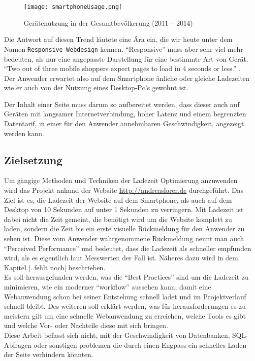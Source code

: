 	\begin{figure}[htbp]
		\begin{center}
			\texttt{[image: smartphoneUsage.png]}
		\end{center}
		\caption{Gerätenutzung in der Gesamtbevölkerung (2011 – 2014)\autocite{tns14}}
		\label{fig:geraetenutzung}
	\end{figure}

	Die Antwort auf diesen Trend läutete eine Ära ein, die wir heute unter dem Namen \texttt{Responsive Webdesign} kennen. "`Responsive"' muss aber sehr viel mehr bedeuten, als nur eine angepasste Darstellung für eine bestimmte Art von Gerät. "`Two out of three mobile shoppers expect pages to load in 4 seconds or less."' \autocite{radware13}. Der Anwender erwartet also auf dem Smartphone änliche oder gleiche Ladezeiten wie er auch von der Nutzung eines Desktop-Pc's gewohnt ist.

	Der Inhalt einer Seite muss darum so aufbereitet werden, dass dieser auch auf Geräten mit langsamer Internetverbindung, hoher Latenz und einem begrenzten Datentarif, in einer für den Anwender annehmbaren Geschwindigkeit, angezeigt werden kann.\\



\subsection{Zielsetzung} %
\label{sub:zielsetzung}
	Um gängige Methoden und Techniken der Ladezeit Optimierung anzuwenden wird das Projekt anhand der Website \url{http://andreaslorer.de} durchgeführt. Das Ziel ist es, die Ladezeit der Website auf dem Smartphone, als auch auf dem Desktop von 10 Sekunden auf unter 1 Sekunden zu verringern. Mit Ladezeit ist dabei nicht die Zeit gemeint, die benötigt wird um die Website komplett zu laden, sondern die Zeit bis ein erste visuelle Rückmeldung für den Anwender zu sehen ist. Diese vom Anwender wahrgenommene Rückmeldung nennt man auch "`Perceived Performance"' und bedeutet, dass die Ladezeit als schneller empfunden wird, als es eigentlich laut Messwerten der Fall ist. Näheres dazu wird in dem Kapitel \ref{..fehlt noch} beschrieben.\\
	Es soll herausgefunden werden, was die "`Best Practices"' sind um die Ladezeit zu minimieren, wie ein moderner "`workflow"' aussehen kann, damit eine Webanwendung schon bei seiner Entstehung schnell ladet und im Projektverlauf schnell bleibt. Des weiteren soll erklärt werden, was für herausforderungen es zu meistern gilt um eine schnelle Webanwendung zu erreichen, welche Tools es gibt und welche Vor- oder Nachteile diese mit sich bringen.\\
	Diese Arbeit befasst sich nicht, mit der Geschwindigkeit von Datenbanken, SQL-Abfragen oder sonstigen problemen die durch einen Engpass ein schnelles Laden der Seite verhindern könnten.

